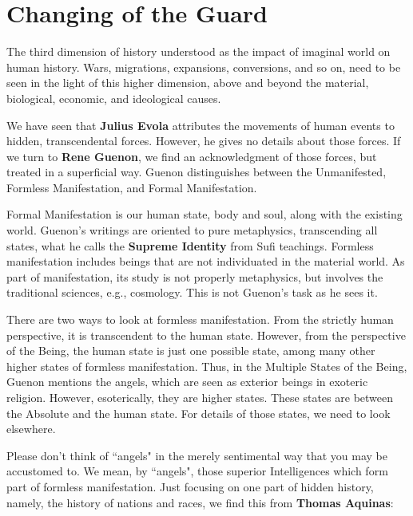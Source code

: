 \section{Changing of the Guard}

The third dimension of history understood as the impact of imaginal world on human history. Wars, migrations, expansions, conversions, and so on, need to be seen in the light of this higher dimension, above and beyond the material, biological, economic, and ideological causes.

We have seen that \textbf{Julius Evola} attributes the movements of human events to hidden, transcendental forces. However, he gives no details about those forces. If we turn to \textbf{Rene Guenon}, we find an acknowledgment of those forces, but treated in a superficial way. Guenon distinguishes between the Unmanifested, Formless Manifestation, and Formal Manifestation.

Formal Manifestation is our human state, body and soul, along with the existing world. Guenon's writings are oriented to pure metaphysics, transcending all states, what he calls the \textbf{Supreme Identity} from Sufi teachings. Formless manifestation includes beings that are not individuated in the material world. As part of manifestation, its study is not properly metaphysics, but involves the traditional sciences, e.g., cosmology. This is not Guenon's task as he sees it.

There are two ways to look at formless manifestation. From the strictly human perspective, it is transcendent to the human state. However, from the perspective of the Being, the human state is just one possible state, among many other higher states of formless manifestation. Thus, in the Multiple States of the Being, Guenon mentions the angels, which are seen as exterior beings in exoteric religion. However, esoterically, they are higher states. These states are between the Absolute and the human state. For details of those states, we need to look elsewhere.

Please don't think of ``angels" in the merely sentimental way that you may be accustomed to. We mean, by ``angels", those superior Intelligences which form part of formless manifestation. Just focusing on one part of hidden history, namely, the history of nations and races, we find this from \textbf{Thomas Aquinas}:

